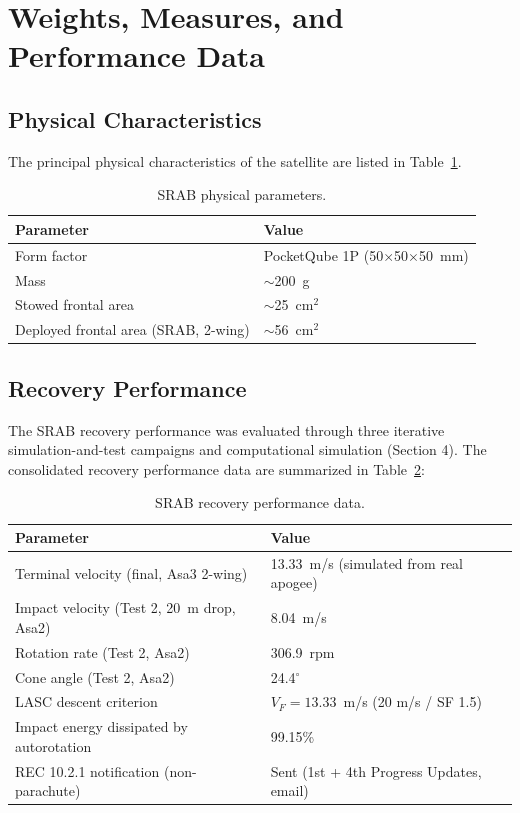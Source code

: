 \section{Weights, Measures, and Performance Data}

\subsection{Physical Characteristics}

The principal physical characteristics of the satellite are listed in
Table~\ref{tab:physical}.

\begin{table}[htbp]
\centering
{\small
\setlength{\tabcolsep}{6pt}
\begin{tabular}{>{\raggedright}p{5.2cm}l}
\toprule
\textbf{Parameter} & \textbf{Value} \\
\midrule
Form factor & PocketQube 1P (50$\times$50$\times$50~mm) \\
Mass & $\sim$200~g \\
Stowed frontal area & $\sim$25~cm$^2$ \\
Deployed frontal area (SRAB, 2-wing) & $\sim$56~cm$^2$ \\
\bottomrule
\end{tabular}
\caption{SRAB physical parameters.}\label{tab:physical}
}
\end{table}

\subsection{Recovery Performance}

The SRAB recovery performance was evaluated through three iterative simulation-and-test
campaigns and computational simulation (Section 4). The consolidated
recovery performance data are summarized in Table~\ref{tab:recovery}:

\begin{table}[htbp]
\centering
{\small
\setlength{\tabcolsep}{6pt}
\begin{tabular}{>{\raggedright}p{5.2cm}l}
\toprule
\textbf{Parameter} & \textbf{Value} \\
\midrule
Terminal velocity (final, Asa3 2-wing) & 13.33~m/s (simulated from real apogee) \\
Impact velocity (Test 2, 20~m drop, Asa2) & 8.04~m/s \\
Rotation rate (Test 2, Asa2) & 306.9~rpm \\
Cone angle (Test 2, Asa2) & 24.4$^{\circ}$ \\
LASC descent criterion & $V_F = 13.33$~m/s (20 m/s / SF 1.5) \\
Impact energy dissipated by autorotation & 99.15\% \\
REC 10.2.1 notification (non-parachute) & Sent (1st + 4th Progress Updates, email) \\
\bottomrule
\end{tabular}
\caption{SRAB recovery performance data.}
\label{tab:recovery}

}
\end{table}

